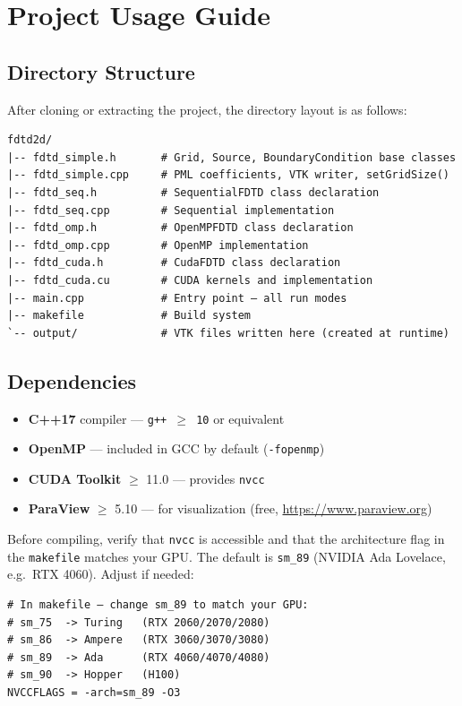 \documentclass[12pt,a4paper]{article}
\begin{document}
\newpage
\section{Project Usage Guide}
\label{app:usage}

\subsection{Directory Structure}

After cloning or extracting the project, the directory layout is as
follows:

\begin{verbatim}
fdtd2d/
|-- fdtd_simple.h       # Grid, Source, BoundaryCondition base classes
|-- fdtd_simple.cpp     # PML coefficients, VTK writer, setGridSize()
|-- fdtd_seq.h          # SequentialFDTD class declaration
|-- fdtd_seq.cpp        # Sequential implementation
|-- fdtd_omp.h          # OpenMPFDTD class declaration
|-- fdtd_omp.cpp        # OpenMP implementation
|-- fdtd_cuda.h         # CudaFDTD class declaration
|-- fdtd_cuda.cu        # CUDA kernels and implementation
|-- main.cpp            # Entry point — all run modes
|-- makefile            # Build system
`-- output/             # VTK files written here (created at runtime)
\end{verbatim}

\subsection{Dependencies}

\begin{itemize}
    \item \textbf{C++17} compiler — \texttt{g++ $\geq$ 10} or equivalent
    \item \textbf{OpenMP} — included in GCC by default (\texttt{-fopenmp})
    \item \textbf{CUDA Toolkit} $\geq$ 11.0 — provides \texttt{nvcc}
    \item \textbf{ParaView} $\geq$ 5.10 — for visualization (free,
          \url{https://www.paraview.org})
\end{itemize}

Before compiling, verify that \texttt{nvcc} is accessible and that
the architecture flag in the \texttt{makefile} matches your GPU.
The default is \texttt{sm\_89} (NVIDIA Ada Lovelace, e.g.\ RTX 4060).
Adjust if needed:

\begin{verbatim}
# In makefile — change sm_89 to match your GPU:
# sm_75  -> Turing   (RTX 2060/2070/2080)
# sm_86  -> Ampere   (RTX 3060/3070/3080)
# sm_89  -> Ada      (RTX 4060/4070/4080)
# sm_90  -> Hopper   (H100)
NVCCFLAGS = -arch=sm_89 -O3
\end{verbatim}
\end{document}

